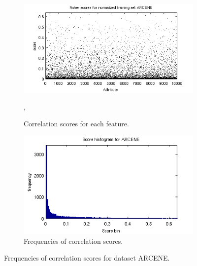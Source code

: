 \documentclass[12pt,a4paper,twocolumn]{article}
\begin{document}
\begin{figure}
        \begin{subfigure}[b]{0.55\textwidth}
                \includegraphics[width=\textwidth]{img/arcene_scatter.png}
                \caption{Correlation scores for each feature.},
                \label{fig:scatter}
        \end{subfigure}
        \begin{subfigure}[b]{0.55\textwidth}
                \includegraphics[width=\textwidth]{img/arcene_bar.png}
                \caption{Frequencies of correlation scores.}
                \label{fig:bar}
        \end{subfigure}
        \caption{{\footnotesize Frequencies of correlation scores for dataset ARCENE.}}
        \label{fig:scatter_bar}
\end{figure}
\end{document}
